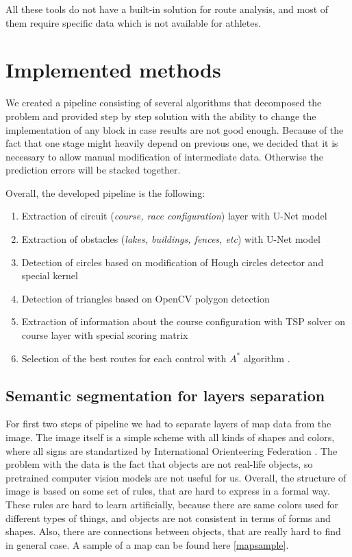 \documentclass[a4paper,12pt]{extarticle}
\begin{document}
All these tools do not have a built-in solution for route analysis, and most of them require specific data which is not available for athletes.

\section{Implemented methods}

We created a pipeline consisting of several algorithms that decomposed the problem and provided step by step solution with the ability to change the implementation of any block in case results are not good enough.
Because of the fact that one stage might heavily depend on previous one, we decided that it is necessary to allow manual modification of intermediate data.
Otherwise the prediction errors will be stacked together.


Overall, the developed pipeline is the following:
\begin{enumerate}
\item Extraction of circuit (\textit{course, race configuration}) layer with U-Net model \cite{unet}
\item Extraction of obstacles (\textit{lakes, buildings, fences, etc}) with U-Net model \cite{unet}
\item Detection of circles based on modification of Hough circles detector \cite{houghcircles} and special kernel 
\item Detection of triangles based on OpenCV polygon detection \cite{findcontours}
\item Extraction of information about the course configuration with TSP solver \cite{tspsolver} on course layer with special scoring matrix
\item Selection of the best routes for each control with $A^*$ algorithm \cite{astar}.
\end{enumerate}


\subsection{Semantic segmentation for layers separation}

For first two steps of pipeline we had to separate layers of map data from the image.
The image itself is a simple scheme with all kinds of shapes and colors, where all signs are standartized by International Orienteering Federation \cite{iof}.
The problem with the data is the fact that objects are not real-life objects, so pretrained computer vision models are not useful for us.
Overall, the structure of image is based on some set of rules, that are hard to express in a formal way.
These rules are hard to learn artificially, because there are same colors used for different types of things, and objects are not consistent in terms of forms and shapes.
Also, there are connections between objects, that are really hard to find in general case. A sample of a map can be found here \ref{mapsample}.
\end{document}

